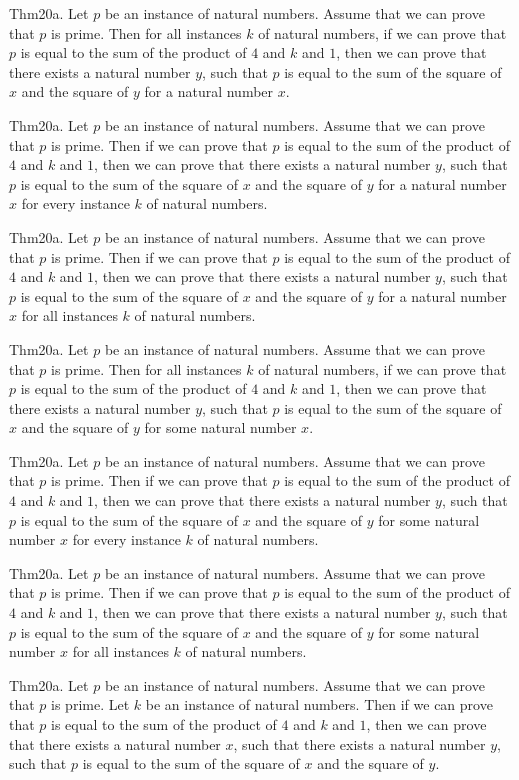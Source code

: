 \documentclass{article}
\begin{document}
Thm20a. Let $p$ be an instance of natural numbers. Assume that we can prove that $p$ is prime. Then for all instances $k$ of natural numbers, if we can prove that $p$ is equal to the sum of the product of $4$ and $k$ and $1$, then we can prove that there exists a natural number $y$, such that $p$ is equal to the sum of the square of $x$ and the square of $y$ for a natural number $x$.

Thm20a. Let $p$ be an instance of natural numbers. Assume that we can prove that $p$ is prime. Then if we can prove that $p$ is equal to the sum of the product of $4$ and $k$ and $1$, then we can prove that there exists a natural number $y$, such that $p$ is equal to the sum of the square of $x$ and the square of $y$ for a natural number $x$ for every instance $k$ of natural numbers.

Thm20a. Let $p$ be an instance of natural numbers. Assume that we can prove that $p$ is prime. Then if we can prove that $p$ is equal to the sum of the product of $4$ and $k$ and $1$, then we can prove that there exists a natural number $y$, such that $p$ is equal to the sum of the square of $x$ and the square of $y$ for a natural number $x$ for all instances $k$ of natural numbers.

Thm20a. Let $p$ be an instance of natural numbers. Assume that we can prove that $p$ is prime. Then for all instances $k$ of natural numbers, if we can prove that $p$ is equal to the sum of the product of $4$ and $k$ and $1$, then we can prove that there exists a natural number $y$, such that $p$ is equal to the sum of the square of $x$ and the square of $y$ for some natural number $x$.

Thm20a. Let $p$ be an instance of natural numbers. Assume that we can prove that $p$ is prime. Then if we can prove that $p$ is equal to the sum of the product of $4$ and $k$ and $1$, then we can prove that there exists a natural number $y$, such that $p$ is equal to the sum of the square of $x$ and the square of $y$ for some natural number $x$ for every instance $k$ of natural numbers.

Thm20a. Let $p$ be an instance of natural numbers. Assume that we can prove that $p$ is prime. Then if we can prove that $p$ is equal to the sum of the product of $4$ and $k$ and $1$, then we can prove that there exists a natural number $y$, such that $p$ is equal to the sum of the square of $x$ and the square of $y$ for some natural number $x$ for all instances $k$ of natural numbers.

Thm20a. Let $p$ be an instance of natural numbers. Assume that we can prove that $p$ is prime. Let $k$ be an instance of natural numbers. Then if we can prove that $p$ is equal to the sum of the product of $4$ and $k$ and $1$, then we can prove that there exists a natural number $x$, such that there exists a natural number $y$, such that $p$ is equal to the sum of the square of $x$ and the square of $y$.
\end{document}
